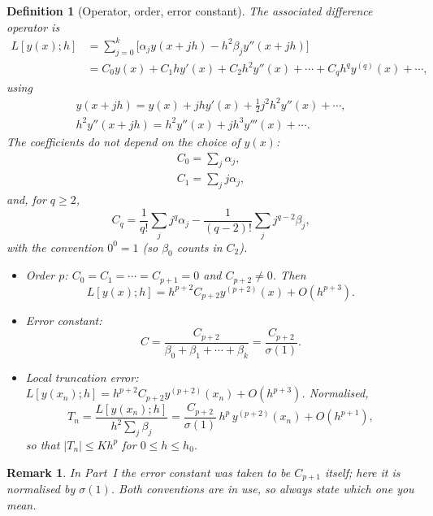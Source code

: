 \documentclass[11pt,a4paper]{article}
\numberwithin{equation}{section}
\theoremstyle{spacedplain}
\theoremstyle{spaceddefinition}
\newtheorem{definition}[theorem]{Definition}
\theoremstyle{spacedremark}
\newtheorem{remark}[theorem]{Remark}
\begin{document}
\begin{definition}[Operator, order, error constant]
The associated difference operator is
\begin{align*}
  L[y(x);h]
  &=\sum_{j=0}^k\bigl[\alpha_jy(x+jh)-h^2\beta_jy''(x+jh)\bigr]\\
  &=C_0y(x)+C_1hy'(x)+C_2h^2y''(x)+\cdots+C_qh^qy^{(q)}(x)+\cdots,
\end{align*}
using
\[
\begin{gathered}
  y(x+jh)=y(x)+jhy'(x)+\tfrac12j^2h^2y''(x)+\cdots,
  \\
  h^2y''(x+jh)=h^2y''(x)+jh^3y'''(x)+\cdots.
\end{gathered}
\]
The coefficients do not depend on the choice of \(y(x)\):
\[
\begin{gathered}
  C_0=\sum_j\alpha_j,
  \\
  C_1=\sum_jj\alpha_j,
\end{gathered}
\]
and, for \(q\ge2\),
\[
  C_q=\frac1{q!}\sum_jj^q\alpha_j-\frac1{(q-2)!}\sum_jj^{q-2}\beta_j,
\]
with the convention \(0^0=1\) (so \(\beta_0\) counts in \(C_2\)).
\begin{itemize}
  \item \emph{Order \(p\):} \(C_0=C_1=\cdots=C_{p+1}=0\) and
    \(C_{p+2}\ne0\).  Then
    \[
      L[y(x);h]=h^{p+2}C_{p+2}y^{(p+2)}(x)+O(h^{p+3}).
    \]
  \item \emph{Error constant:}
    \[
      C=\frac{C_{p+2}}{\beta_0+\beta_1+\cdots+\beta_k}
       =\frac{C_{p+2}}{\sigma(1)}.
    \]
  \item \emph{Local truncation error:}
    \(L[y(x_n);h]=h^{p+2}C_{p+2}y^{(p+2)}(x_n)+O(h^{p+3})\).
    Normalised,
    \[
      T_n=\frac{L[y(x_n);h]}{h^2\sum_j\beta_j}
      =\frac{C_{p+2}}{\sigma(1)}\,h^p\,y^{(p+2)}(x_n)+O(h^{p+1}),
    \]
    so that \(|T_n|\le Kh^p\) for \(0\le h\le h_0\).
\end{itemize}
\end{definition}

\begin{remark}
In Part~I the error constant was taken to be \(C_{p+1}\) itself; here
it is normalised by \(\sigma(1)\).  Both conventions are in use, so
always state which one you mean.
\end{remark}
\end{document}
